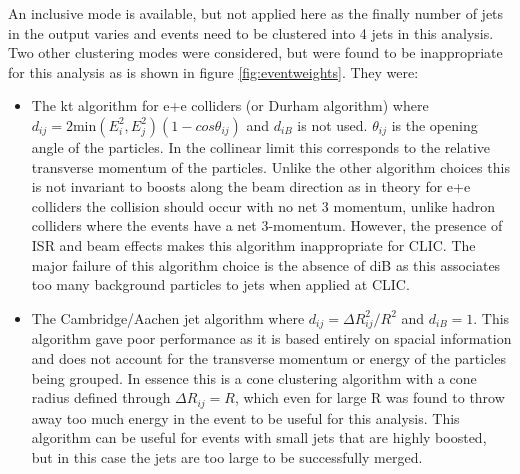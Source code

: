 An inclusive mode is available, but not applied here as the finally number of jets in the output varies and events need to be clustered into 4 jets in this analysis.  Two other clustering modes were considered, but were found to be inappropriate for this analysis as is shown in figure \ref{fig:eventweights}. They were:

\begin{itemize}
\item The kt algorithm for e+e  colliders (or Durham algorithm) where $d_{ij} = 2\text{min}(E_{i}^{2}, E_{j}^{2})(1-cos\theta_{ij})$ and $d_{iB}$ is not used. $\theta_{ij}$ is the opening angle of the particles. In the collinear limit this corresponds to the relative transverse momentum of the particles. Unlike the other algorithm choices this is not invariant to boosts along the beam direction as in theory for e+e  colliders the collision should occur with no net 3 momentum, unlike hadron colliders where the events have a net 3-momentum. However, the presence of ISR and beam effects makes this algorithm inappropriate for CLIC. The major failure of this algorithm choice is the absence of diB as this associates too many background particles to jets when applied at CLIC.
\item The Cambridge/Aachen jet algorithm where $d_{ij} = {\Delta}R_{ij}^{2}/R^2$ and $d_{iB} = 1$. This algorithm gave poor performance as it is based entirely on spacial information and does not account for the transverse momentum or energy of the particles being grouped. In essence this is a cone clustering algorithm with a cone radius defined through ${\Delta}R_{ij} = R$, which even for large R was found to throw away too much energy in the event to be useful for this analysis. This algorithm can be useful for events with small jets that are highly boosted, but in this case the jets are too large to be successfully merged.
\end{itemize}

